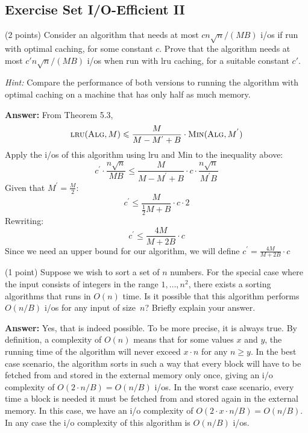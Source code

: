 \documentclass{article}
\renewcommand{\leq}{\leqslant}
\renewcommand{\geq}{\geqslant}
\newcommand{\io}{{\sc i/o}\xspace}
\newcommand{\ios}{{\io}s\xspace}
\newcommand{\lru}{{\sc lru}\xspace}
\newcounter{rcounter}
\newenvironment{rlist}%
{\begin{list}{\setnr-\arabic{rcounter}}{\usecounter{rcounter}}}{\end{list}}
\begin{document}
    \subsection*{Exercise Set I/O-Efficient II}
    \begin{rlist}
        
        \item (2 points)
        Consider an algorithm that needs at most $c n\sqrt{n} / (MB)$ \ios if run with optimal caching, for some constant $c$. Prove that the algorithm needs at most $c' n\sqrt{n} / (MB)$ \ios when run with \lru caching, for a suitable constant $c'$.
        
        \emph{Hint:} Compare the performance of both versions to running the algorithm with optimal caching on a machine that has only half as much memory.
        
        \textbf{Answer:}
        From Theorem 5.3, 
        $$\textrm{\lru}(\textrm{\sc Alg}, M) \leq \frac{M}{M-M^{'}+B} \cdot \textrm{\sc Min}(\textrm{\sc Alg}, M^{'})$$
        Apply the \ios of this algorithm using \lru and {\sc Min} to the inequality above:
        $$c^{'} \cdot \frac{n \sqrt{n}}{MB} \leq \frac{M}{M-M^{'}+B} \cdot c \cdot \frac{n \sqrt{n}}{M^{'}B}$$
        Given that $M^{'} = \frac{M}{2}$:
        $$c^{'} \leq \frac{M}{\frac{1}{2}M+B} \cdot c \cdot 2$$
        Rewriting:
        $$c^{'} \leq \frac{4M}{M+2B} \cdot c$$
        Since we need an upper bound for our algorithm, we will define $c^{'} = \frac{4M}{M+2B} \cdot c$
        
        \item (1 point)
        Suppose we wish to sort a set of $n$ numbers. For the special case where the input consists of integers in the range $1,\ldots,n^2$, there exists a sorting algorithms that runs in $O(n)$ time. Is it possible that this algorithm performs $O(n/B)$ \ios for any input of size~$n$? Briefly explain your answer.
        
        \textbf{Answer:}
        Yes, that is indeed possible. To be more precise, it is always true. By definition, a complexity of $O(n)$ means that for some values $x$ and $y$, the running time of the algorithm will never exceed $x \cdot n$ for any $n \geq y$. In the best case scenario, the algorithm sorts in such a way that every block will have to be fetched from and stored in the external memory only once, giving an \io complexity of $O(2 \cdot n/B)=O(n/B)$ \ios. In the worst case scenario, every time a block is needed it must be fetched from and stored again in the external memory. In this case, we have an \io complexity of $O(2 \cdot x \cdot n/B) = O(n/B)$. In any case the \io complexity of this algorithm is $O(n/B)$ \ios.
        

\end{rlist}
\end{document}
